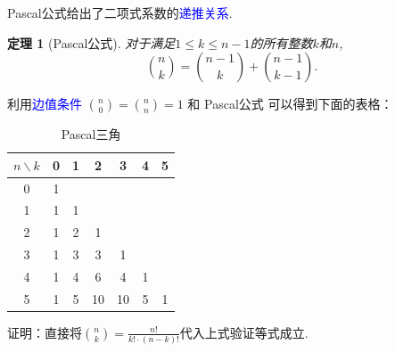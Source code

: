 \documentclass[10pt,punct]{ctexbeamer}
\newtheorem{thm}{定理}
\newcommand{\blue}{\textcolor{blue}}
\begin{document}
\begin{frame}



    Pascal公式给出了二项式系数的\blue{递推关系}.
    \begin{thm}[Pascal公式]

        对于满足$1\leq k\leq n-1$的所有整数$k$和$n$,
        \[
        \binom{n}{k}=\binom{n-1}{k}+\binom{n-1}{k-1}.
        \]
    \end{thm}


    利用\blue{边值条件}
    ${n \choose 0}={n \choose n}=1$  和 Pascal公式 可以得到下面的表格：
    \begin{table}[]
        \begin{tabular}{c|cccccc}
            $n\backslash k$ & 0 & 1 & 2  & 3  & 4 & 5 \\ \hline
            0 & 1 &   &    &    &   &   \\
            1 & 1 & 1 &    &    &   &   \\
            2 & 1 & 2 & 1  &    &   &   \\
            3 & 1 & 3 & 3  & 1  &   &   \\
            4 & 1 & 4 & 6  & 4  & 1 &   \\
            5 & 1 & 5 & 10 & 10 & 5 & 1 \\
        \end{tabular}
        \caption{Pascal三角}
    \end{table}

    \vspace{-10pt}


    \pause
    证明：直接将$\binom{n}{k}=\frac{n!}{k!\cdot(n-k)!}$代入上式验证等式成立.
\end{frame}
\end{document}

